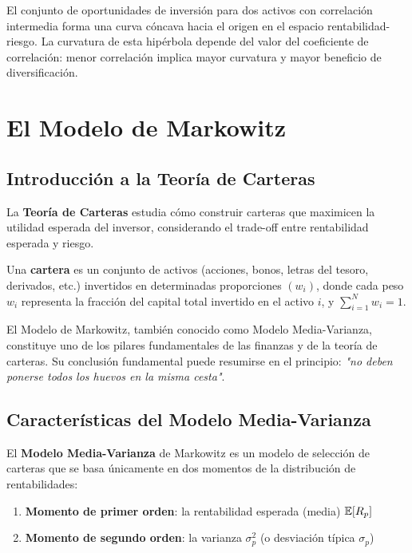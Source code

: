 El conjunto de oportunidades de inversión para dos activos con correlación intermedia forma una curva cóncava hacia el origen en el espacio rentabilidad-riesgo. La curvatura de esta hipérbola depende del valor del coeficiente de correlación: menor correlación implica mayor curvatura y mayor beneficio de diversificación.

\section{El Modelo de Markowitz}

\subsection{Introducción a la Teoría de Carteras}

\begin{definicion}
La \textbf{Teoría de Carteras} estudia cómo construir carteras que maximicen la utilidad esperada del inversor, considerando el trade-off entre rentabilidad esperada y riesgo.
\end{definicion}

\begin{definicion}[Cartera]
Una \textbf{cartera} es un conjunto de activos (acciones, bonos, letras del tesoro, derivados, etc.) invertidos en determinadas proporciones $(w_i)$, donde cada peso $w_i$ representa la fracción del capital total invertido en el activo $i$, y $\sum_{i=1}^N w_i = 1$.
\end{definicion}

El Modelo de Markowitz, también conocido como Modelo Media-Varianza, constituye uno de los pilares fundamentales de las finanzas y de la teoría de carteras. Su conclusión fundamental puede resumirse en el principio: \textit{"no deben ponerse todos los huevos en la misma cesta"}.

\subsection{Características del Modelo Media-Varianza}

\begin{definicion}
El \textbf{Modelo Media-Varianza} de Markowitz es un modelo de selección de carteras que se basa únicamente en dos momentos de la distribución de rentabilidades:
\begin{enumerate}
\item \textbf{Momento de primer orden}: la rentabilidad esperada (media) $\mathbb{E}[R_p]$
\item \textbf{Momento de segundo orden}: la varianza $\sigma_p^2$ (o desviación típica $\sigma_p$)
\end{enumerate}
\end{definicion}

